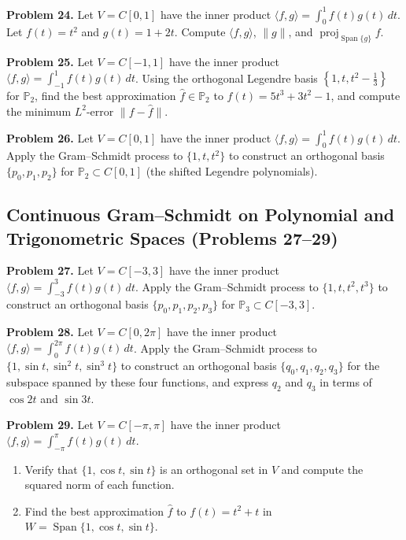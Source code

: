 \documentclass[11pt, letterpaper]{article}
\theoremstyle{definition}
\theoremstyle{remark}
\begin{document}
\textbf{Problem 24.} Let $V = C[0, 1]$ have the inner product $\langle f, g \rangle = \int_0^1 f(t)g(t)\,dt$. Let $f(t) = t^2$ and $g(t) = 1 + 2t$. Compute $\langle f, g \rangle$, $\|g\|$, and $\operatorname{proj}_{\operatorname{Span}\{g\}} f$.

\textbf{Problem 25.} Let $V = C[-1, 1]$ have the inner product $\langle f, g \rangle = \int_{-1}^1 f(t)g(t)\,dt$. Using the orthogonal Legendre basis $\left\{1, t, t^2 - \frac{1}{3}\right\}$ for $\mathbb{P}_2$, find the best approximation $\hat{f} \in \mathbb{P}_2$ to $f(t) = 5t^3 + 3t^2 - 1$, and compute the minimum $L^2$-error $\|f - \hat{f}\|$.

\textbf{Problem 26.} Let $V = C[0, 1]$ have the inner product $\langle f, g \rangle = \int_0^1 f(t)g(t)\,dt$. Apply the Gram--Schmidt process to $\{1, t, t^2\}$ to construct an orthogonal basis $\{p_0, p_1, p_2\}$ for $\mathbb{P}_2 \subset C[0, 1]$ (the shifted Legendre polynomials).

\subsection{Continuous Gram--Schmidt on Polynomial and Trigonometric Spaces (Problems 27--29)}

\textbf{Problem 27.} Let $V = C[-3, 3]$ have the inner product $\langle f, g \rangle = \int_{-3}^3 f(t)g(t)\,dt$. Apply the Gram--Schmidt process to $\{1, t, t^2, t^3\}$ to construct an orthogonal basis $\{p_0, p_1, p_2, p_3\}$ for $\mathbb{P}_3 \subset C[-3, 3]$.

\textbf{Problem 28.} Let $V = C[0, 2\pi]$ have the inner product $\langle f, g \rangle = \int_0^{2\pi} f(t)g(t)\,dt$. Apply the Gram--Schmidt process to $\{1, \sin t, \sin^2 t, \sin^3 t\}$ to construct an orthogonal basis $\{q_0, q_1, q_2, q_3\}$ for the subspace spanned by these four functions, and express $q_2$ and $q_3$ in terms of $\cos 2t$ and $\sin 3t$.

\textbf{Problem 29.} Let $V = C[-\pi, \pi]$ have the inner product $\langle f, g \rangle = \int_{-\pi}^{\pi} f(t)g(t)\,dt$.
\begin{enumerate}[label=(\alph*)]
    \item Verify that $\{1, \cos t, \sin t\}$ is an orthogonal set in $V$ and compute the squared norm of each function.
    \item Find the best approximation $\hat{f}$ to $f(t) = t^2 + t$ in $W = \operatorname{Span}\{1, \cos t, \sin t\}$.
\end{enumerate}
\end{document}

